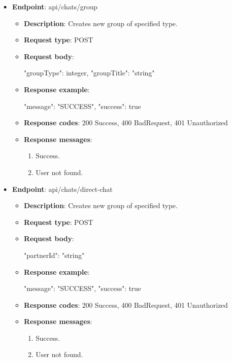 \begin{itemize}
    \item \textbf{Endpoint}: api/chats/group
    \begin{itemize}
        \item \textbf{Description}: Creates new group of specified type.
        \item \textbf{Request type}: POST
        \item \textbf{Request body}:
        \begin{spverbatim}
        {
            "groupType": integer,
            "groupTitle": "string"
        }
        \end{spverbatim}
        \item \textbf{Response example}:
        \begin{spverbatim}
        {
            "message": "SUCCESS",
            "success": true
        }
        \end{spverbatim}
        \item \textbf{Response codes}: 200 Success, 400 BadRequest, 401 Unauthorized
        \item \textbf{Response messages}:
        \begin{enumerate}
            \item Success.
            \item User not found.
        \end{enumerate}
    \end{itemize}

    \item \textbf{Endpoint}: api/chats/direct-chat
    \begin{itemize}
        \item \textbf{Description}: Creates new group of specified type.
        \item \textbf{Request type}: POST
        \item \textbf{Request body}:
        \begin{spverbatim}
        {
            "partnerId": "string"
        }
        \end{spverbatim}
        \item \textbf{Response example}:
        \begin{spverbatim}
        {
            "message": "SUCCESS",
            "success": true
        }
        \end{spverbatim}
        \item \textbf{Response codes}: 200 Success, 400 BadRequest, 401 Unauthorized
        \item \textbf{Response messages}:
        \begin{enumerate}
            \item Success.
            \item User not found.
        \end{enumerate}
    \end{itemize}


\end{itemize}
